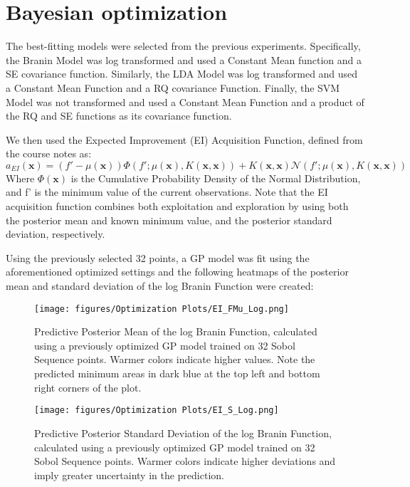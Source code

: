 \documentclass[11pt]{article}
\numberwithin{equation}{section}
\begin{document}
\section{Bayesian optimization}

The best-fitting models were selected from the previous experiments. 
Specifically, the Branin Model was log transformed and used a Constant Mean function and a SE covariance function.
Similarly, the LDA Model was log transformed and used a Constant Mean Function and a RQ covariance Function.
Finally, the SVM Model was not transformed and used a Constant Mean Function and a product of the RQ and SE functions as its covariance function.

We then used the Expected Improvement (EI) Acquisition Function, defined from the course notes as:
\begin{equation}
  a_{EI}(\bm{x}) = (f' - \mu(\bm{x}))\Phi(f';\mu(\bm{x}),K(\bm{x},\bm{x})) + K(\bm{x},\bm{x})\mathcal{N}(f';\mu(\bm{x}),K(\bm{x},\bm{x}))
  \label{eq:Expected Improvement}
\end{equation}
Where $\Phi(\bm{x})$ is the Cumulative Probability Density of the Normal Distribution, and f' is the minimum value of the current observations.
Note that the EI acquisition function combines both exploitation and exploration by using both the posterior mean and known minimum value, and the posterior standard deviation, respectively. 

Using the previously selected 32 points, a GP model was fit using the aforementioned optimized settings and the following heatmaps of the posterior mean and standard deviation of the log Branin Function were created:

\begin{figure}[H]
  \centering
  \texttt{[image: figures/Optimization Plots/EI\_FMu\_Log.png]}
  \caption{Predictive Posterior Mean of the log Branin Function, calculated using a previously optimized GP model trained on 32 Sobol Sequence points. Warmer colors indicate higher values. Note the predicted minimum areas in dark blue at the top left and bottom right corners of the plot.}
  \label{fig:ei-fmu-log}
\end{figure}

\begin{figure}[H]
  \centering
  \texttt{[image: figures/Optimization Plots/EI\_S\_Log.png]}
  \caption{Predictive Posterior Standard Deviation of the log Branin Function, calculated using a previously optimized GP model trained on 32 Sobol Sequence points. Warmer colors indicate higher deviations and imply greater uncertainty in the prediction.}
  \label{fig:ei-fs-log}
\end{figure}
\end{document}
